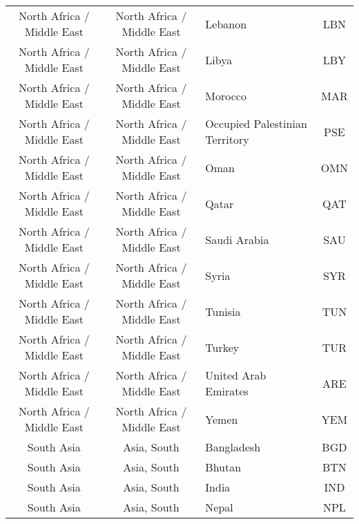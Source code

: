 \begin{landscape}
\begin{longtable}{|c|c|p{5cm}|c|}
    North Africa / Middle East &   North Africa / Middle East &                                           Lebanon &  LBN \\
    North Africa / Middle East &   North Africa / Middle East &                                             Libya &  LBY \\
    North Africa / Middle East &   North Africa / Middle East &                                           Morocco &  MAR \\
    North Africa / Middle East &   North Africa / Middle East &    \raggedright    Occupied Palestinian Territory &  PSE \\
    North Africa / Middle East &   North Africa / Middle East &                                              Oman &  OMN \\
    North Africa / Middle East &   North Africa / Middle East &                                             Qatar &  QAT \\
    North Africa / Middle East &   North Africa / Middle East &                                      Saudi Arabia &  SAU \\
    North Africa / Middle East &   North Africa / Middle East &                                             Syria &  SYR \\
    North Africa / Middle East &   North Africa / Middle East &                                           Tunisia &  TUN \\
    North Africa / Middle East &   North Africa / Middle East &                                            Turkey &  TUR \\
    North Africa / Middle East &   North Africa / Middle East &                              United Arab Emirates &  ARE \\
    North Africa / Middle East &   North Africa / Middle East &                                             Yemen &  YEM \\
                    South Asia &                  Asia, South &                                        Bangladesh &  BGD \\
                    South Asia &                  Asia, South &                                            Bhutan &  BTN \\
                    South Asia &                  Asia, South &                                             India &  IND \\
                    South Asia &                  Asia, South &                                             Nepal &  NPL \\

\end{longtable}
\end{landscape}
